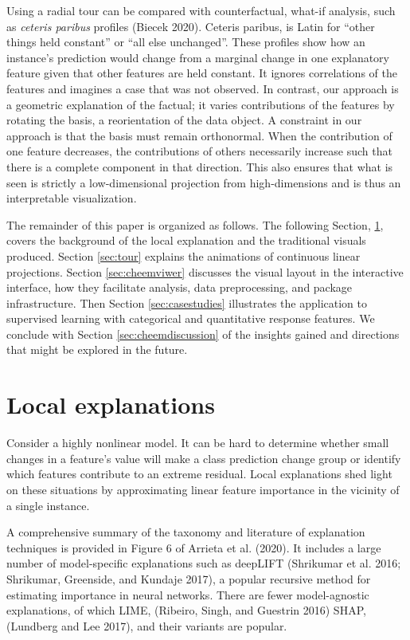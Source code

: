 \documentclass[
]{article}
\begin{document}
Using a radial tour can be compared with counterfactual, what-if analysis, such as \emph{ceteris paribus} profiles (Biecek 2020). Ceteris paribus, is Latin for ``other things held constant'' or ``all else unchanged''. These profiles show how an instance's prediction would change from a marginal change in one explanatory feature given that other features are held constant. It ignores correlations of the features and imagines a case that was not observed. In contrast, our approach is a geometric explanation of the factual; it varies contributions of the features by rotating the basis, a reorientation of the data object. A constraint in our approach is that the basis must remain orthonormal. When the contribution of one feature decreases, the contributions of others necessarily increase such that there is a complete component in that direction. This also ensures that what is seen is strictly a low-dimensional projection from high-dimensions and is thus an interpretable visualization.

The remainder of this paper is organized as follows. The following Section, \ref{sec:explanations}, covers the background of the local explanation and the traditional visuals produced. Section \ref{sec:tour} explains the animations of continuous linear projections. Section \ref{sec:cheemviwer} discusses the visual layout in the interactive interface, how they facilitate analysis, data preprocessing, and package infrastructure. Then Section \ref{sec:casestudies} illustrates the application to supervised learning with categorical and quantitative response features. We conclude with Section \ref{sec:cheemdiscussion} of the insights gained and directions that might be explored in the future.

\hypertarget{sec:explanations}{%
\section{Local explanations}\label{sec:explanations}}

Consider a highly nonlinear model. It can be hard to determine whether small changes in a feature's value will make a class prediction change group or identify which features contribute to an extreme residual. Local explanations shed light on these situations by approximating linear feature importance in the vicinity of a single instance.

A comprehensive summary of the taxonomy and literature of explanation techniques is provided in Figure 6 of Arrieta et al. (2020). It includes a large number of model-specific explanations such as deepLIFT (Shrikumar et al. 2016; Shrikumar, Greenside, and Kundaje 2017), a popular recursive method for estimating importance in neural networks. There are fewer model-agnostic explanations, of which LIME, (Ribeiro, Singh, and Guestrin 2016) SHAP, (Lundberg and Lee 2017), and their variants are popular.
\end{document}
